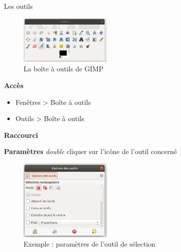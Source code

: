 \documentclass[10pt,svgnames,usenames,table]{beamer}
\begin{document}
\begin{frame}[allowframebreaks]{Les outils}
	
	\begin{figure}
        	\centering
        	\includegraphics[width=0.4\textwidth]{Images/gimp_toolbox}
        	\caption{La boîte à outils de GIMP} 
    	\end{figure}
	
	\textbf{Accès}
	
	\begin{itemize}
		\item Fenêtres > Boîte à outils
		\item Outils > Boîte à outils
	\end{itemize}
	
	\vspace{0.2cm}
	\textbf{Raccourci} 
	
	\framebreak
	\textbf{Paramètres} \textit{double} cliquer sur l'icône de l'outil concerné
	\begin{figure}
        	\centering
        	\includegraphics[width=0.4\textwidth]{Images/option_outil}
        	\caption{Exemple : paramètres de l'outil de sélection} 
    	\end{figure}

\end{frame}	
\end{document}
